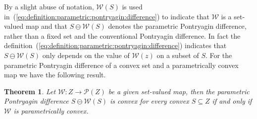 \documentclass[final]{elsarticle}
\newcounter{thmcount}
\newtheorem{thm}[thmcount]{Theorem}
\theoremstyle{remark}
\theoremstyle{definition}
\begin{document}
%
By a slight abuse of notation, $\mathcal{W}(S)$ is used in~(\ref{eq:definition:parametric:pontryagin:difference}) to indicate that $\mathcal{W}$ is a set-valued map and that $S\ominus\mathcal{W}(S)$ denotes the parametric Pontryagin difference, rather than a fixed set and the conventional Pontryagin difference. 
%
In fact the definition~(\ref{eq:definition:parametric:pontryagin:difference}) indicates that $S\ominus \mathcal{W}(S)$ only depends on the value of $\mathcal{W}(z)$ on a subset of $S$. 
%
%
For the parametric Pontryagin difference of a convex set and a parametrically convex map we 
have the following result.
%
\begin{thm}\label{thm:convexity:of:pontryagin:difference}
Let $\mathcal W: Z\rightarrow\mathscr P(Z)$ be a given set-valued map, then the parametric Pontryagin difference $S \ominus \mathcal W(S)$ is convex for every convex $S\subseteq Z$ if and only if $\mathcal W$ is parametrically convex.
\end{thm}
%
\end{document}
